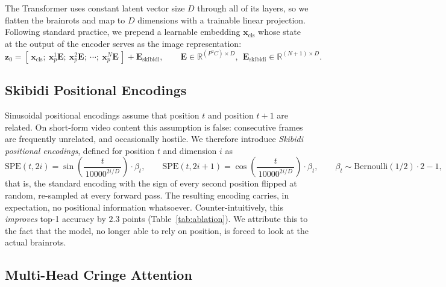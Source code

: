 \documentclass[10pt]{article}
\begin{document}
The Transformer uses constant latent vector size $D$ through all of its layers,
so we flatten the brainrots and map to $D$ dimensions with a trainable linear
projection. Following standard practice, we prepend a learnable embedding
$\mathbf{x}_{\text{cls}}$ whose state at the output of the encoder serves as the
image representation:
\begin{equation}
\mathbf{z}_0 = \left[\, \mathbf{x}_{\text{cls}};\ \mathbf{x}_p^{1}\mathbf{E};\ \mathbf{x}_p^{2}\mathbf{E};\ \cdots;\ \mathbf{x}_p^{N}\mathbf{E} \,\right] + \mathbf{E}_{\text{skibidi}},
\qquad \mathbf{E}\in\mathbb{R}^{(P^2C)\times D},\ \ \mathbf{E}_{\text{skibidi}}\in\mathbb{R}^{(N+1)\times D}.
\label{eq:embed}
\end{equation}

\subsection{Skibidi Positional Encodings}
\label{sec:skibidi}

Sinusoidal positional encodings assume that position $t$ and position $t+1$ are
related. On short-form video content this assumption is false: consecutive
frames are frequently unrelated, and occasionally hostile. We therefore
introduce \emph{Skibidi positional encodings}, defined for position $t$ and
dimension $i$ as
\begin{equation}
\mathrm{SPE}(t, 2i) = \sin\!\left(\frac{t}{\,10000^{2i/D}\,}\right)\cdot \beta_t,
\qquad
\mathrm{SPE}(t, 2i{+}1) = \cos\!\left(\frac{t}{\,10000^{2i/D}\,}\right)\cdot \beta_t,
\qquad
\beta_t \sim \mathrm{Bernoulli}(1/2)\cdot 2 - 1 ,
\label{eq:spe}
\end{equation}
that is, the standard encoding with the sign of every second position flipped
at random, re-sampled at every forward pass. The resulting encoding carries, in
expectation, no positional information whatsoever. Counter-intuitively, this
\emph{improves} top-1 accuracy by $2.3$ points (Table~\ref{tab:ablation}). We
attribute this to the fact that the model, no longer able to rely on position,
is forced to look at the actual brainrots.

\subsection{Multi-Head Cringe Attention}
\label{sec:mhca}
\end{document}
